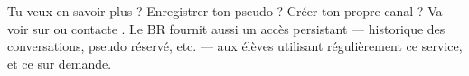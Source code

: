  Tu veux en savoir plus ? Enregistrer ton pseudo ? Créer ton propre canal ? Va voir sur  ou contacte .
 Le BR fournit aussi un accès persistant — historique des conversations, pseudo réservé, etc. — aux élèves utilisant régulièrement ce service, et ce sur demande.

